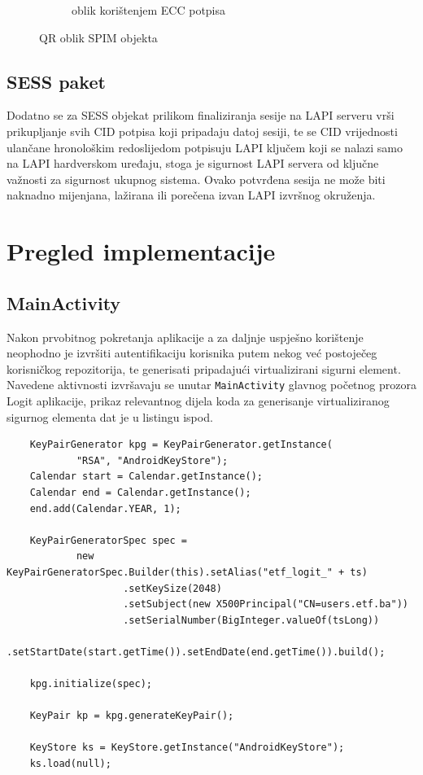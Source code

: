 \begin{figure}[H]
\begin{subfigure}{.5\textwidth}
        \caption{oblik korištenjem ECC potpisa}
        \label{img:qr_ecc}
    \end{subfigure}
    \caption{QR oblik SPIM objekta}%
    \label{img:qr}
\end{figure}

\subsection{SESS paket}
Dodatno se za SESS objekat prilikom finaliziranja sesije na LAPI serveru vrši prikupljanje svih CID potpisa koji pripadaju datoj sesiji, te se CID vrijednosti ulančane hronološkim redoslijedom potpisuju LAPI ključem koji se nalazi samo na LAPI hardverskom uređaju, stoga je sigurnost LAPI servera od ključne važnosti za sigurnost ukupnog sistema. Ovako potvrđena sesija ne može biti naknadno mijenjana, lažirana ili porečena izvan LAPI izvršnog okruženja.

\cleardoublepage
\section{Pregled implementacije}
\subsection{MainActivity}
Nakon prvobitnog pokretanja aplikacije a za daljnje uspješno korištenje neophodno je izvršiti autentifikaciju korisnika putem nekog već postoječeg korisničkog repozitorija, te generisati pripadajući virtualizirani sigurni element. Navedene aktivnosti izvršavaju se unutar \texttt{MainActivity} glavnog početnog prozora Logit aplikacije, prikaz relevantnog dijela koda za generisanje virtualiziranog sigurnog elementa dat je u listingu ispod.

\begin{verbatim}
    KeyPairGenerator kpg = KeyPairGenerator.getInstance(
            "RSA", "AndroidKeyStore");
    Calendar start = Calendar.getInstance();
    Calendar end = Calendar.getInstance();
    end.add(Calendar.YEAR, 1);

    KeyPairGeneratorSpec spec =
            new KeyPairGeneratorSpec.Builder(this).setAlias("etf_logit_" + ts)
                    .setKeySize(2048)
                    .setSubject(new X500Principal("CN=users.etf.ba"))
                    .setSerialNumber(BigInteger.valueOf(tsLong))
                    .setStartDate(start.getTime()).setEndDate(end.getTime()).build();

    kpg.initialize(spec);

    KeyPair kp = kpg.generateKeyPair();

    KeyStore ks = KeyStore.getInstance("AndroidKeyStore");
    ks.load(null);
\end{verbatim}


